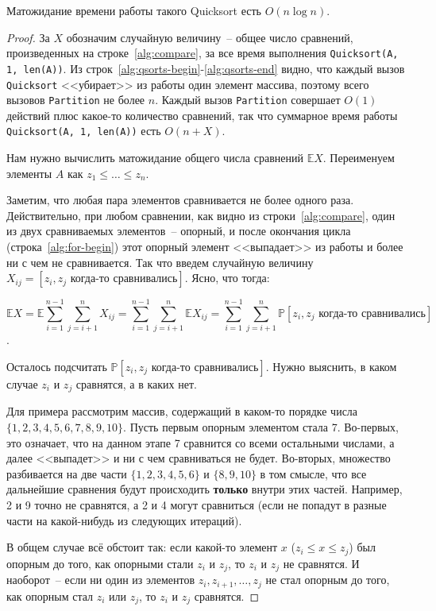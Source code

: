 \begin{theorem*}
    Матожидание времени работы такого Quicksort есть $O(n\log n)$.
\end{theorem*}
\begin{proof}
    За $X$ обозначим случайную величину~-- общее число сравнений, произведенных на строке~\ref{alg:compare}, за все время выполнения \texttt{Quicksort(A, 1, len(A))}. Из строк~\ref{alg:qsorts-begin}-\ref{alg:qsorts-end} видно, что каждый вызов \texttt{Quicksort} <<убирает>> из работы один элемент массива, поэтому всего вызовов \texttt{Partition} не более $n$. Каждый вызов \texttt{Partition} совершает $O(1)$ действий плюс какое-то количество сравнений, так что суммарное время работы \texttt{Quicksort(A, 1, len(A))} есть $O(n+X)$.
    
    Нам нужно вычислить матожидание общего числа сравнений $\mathbb E X$. Переименуем элементы $A$ как $z_1 \leq \ldots \leq z_n$.
    
    Заметим, что любая пара элементов сравнивается не более одного раза. Действительно, при любом сравнении, как видно из строки~\ref{alg:compare}, один из двух сравниваемых элементов~-- опорный, и после окончания цикла (строка~\ref{alg:for-begin}) этот опорный элемент <<выпадает>> из работы и более ни с чем не сравнивается. Так что введем случайную величину $X_{ij} = [z_i, z_j \text{ когда-то сравнивались}]$. Ясно, что тогда:
    
    $$\mathbb E X = \mathbb E \sum_{i=1}^{n-1} \sum_{j=i+1}^n X_{ij} = \sum_{i=1}^{n-1} \sum_{j=i+1}^n \mathbb E X_{ij} = \sum_{i=1}^{n-1} \sum_{j=i+1}^n \mathbb P[z_i, z_j \text{ когда-то сравнивались}]$$.
    
    Осталось подсчитать $\mathbb P[z_i, z_j\text{ когда-то сравнивались}]$. Нужно выяснить, в каком случае $z_i$ и $z_j$ сравнятся, а в каких нет.
    
    Для примера рассмотрим массив, содержащий в каком-то порядке числа $\{1,2,3,4,5,6,7,8,9,10\}$. Пусть первым опорным элементом стала 7. Во-первых, это означает, что на данном этапе 7 сравнится со всеми остальными числами, а далее <<выпадет>> и ни с чем сравниваться не будет. Во-вторых, множество разбивается на две части $\{1,2,3,4,5,6\}$ и $\{8,9,10\}$ в том смысле, что все дальнейшие сравнения будут происходить \textbf{только} внутри этих частей. Например, 2 и 9 точно не сравнятся, а 2 и 4 могут сравниться (если не попадут в разные части на какой-нибудь из следующих итераций).
    
    В общем случае всё обстоит так: если какой-то элемент $x$ ($z_i \leq x \leq z_j$) был опорным до того, как опорными стали $z_i$ и $z_j$, то $z_i$ и $z_j$ не сравнятся. И наоборот~-- если ни один из элементов $z_i, z_{i+1},\ldots, z_j$ не стал опорным до того, как опорным стал $z_i$ или $z_j$, то $z_i$ и $z_j$ сравнятся.
    

\end{proof}
